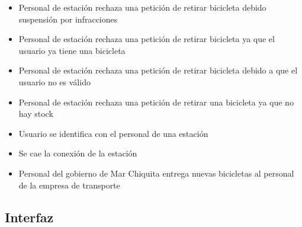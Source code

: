 \documentclass[a4paper, 10pt, twoside]{article}
\begin{document}
\begin{multicols}{2}
\begin{itemize}
    \item Personal de estación rechaza una petición de retirar bicicleta debido suspensión por infracciones
    \item Personal de estación rechaza una petición de retirar bicicleta ya que el usuario ya tiene una bicicleta
    \item Personal de estación rechaza una petición de retirar bicicleta debido a que el usuario no es válido
    \item Personal de estación rechaza una petición de retirar una bicicleta ya que no hay stock
    \item Usuario se identifica con el personal de una estación
    \item Se cae la conexión de la estación
    \item Personal del gobierno de Mar Chiquita entrega nuevas bicicletas al personal de la empresa de transporte
  \end{itemize}
\end{multicols}


\subsection{Interfaz}
\end{document}
